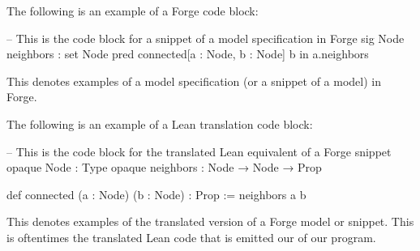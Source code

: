 The following is an example of a Forge code block: 
\begin{forge}
-- This is the code block for a snippet of a model specification in Forge
sig Node {
  neighbors : set Node
}
pred connected[a : Node, b : Node] {
  b in a.neighbors
}
\end{forge}
This denotes examples of a model specification (or a snippet of a model) in Forge. 

The following is an example of a Lean translation code block:
\begin{lean}
-- This is the code block for the translated Lean equivalent of a Forge snippet
opaque Node : Type
opaque neighbors : Node → Node → Prop

def connected (a : Node) (b : Node) : Prop :=
  neighbors a b
\end{lean}
This denotes examples of the translated version of a Forge model or snippet. This is oftentimes the translated Lean code that is emitted our of our program. 